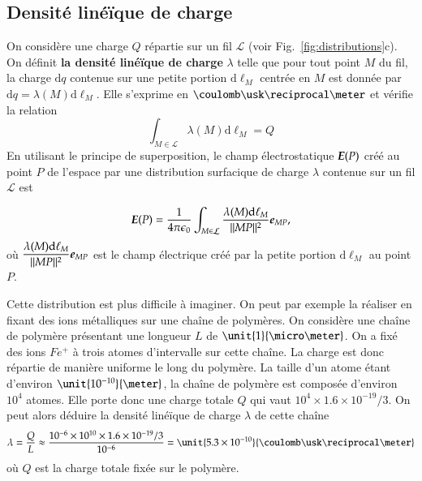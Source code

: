 \subsection{Densité linéïque de charge}
	On considère une charge $Q$ répartie sur un fil $\mathcal{L}$
	(voir Fig.~\ref{fig:distributions}c). 
	On définit \textbf{
	la densité linéïque de charge} $\lambda$ 
	telle que pour tout point $M$ du fil,
	la charge $\mathrm{d}q$ contenue sur une petite portion $\mathrm{d}\ell_M$ centrée 
	en $M$ est donnée par $\mathrm{d}q = \lambda(M) \mathrm{d}\ell_M$.
	Elle s'exprime en $\coulomb \usk \reciprocal \meter$ et vérifie la relation
\begin{equation*}
	\int_{M \in \mathcal{L}} \lambda(M) \mathrm{d}\ell_M = Q
\end{equation*}
En utilisant le principe de superposition, le champ électrostatique $\vece(P)$
créé au point $P$ de l'espace par une distribution surfacique de charge $\lambda$
contenue sur un fil $\mathcal{L}$ est

\begin{equation}
	\vece(P) = \pieps \int_{M \in \mathcal{L}} 
	\dfrac{\lambda(M) \mathrm{d}\ell_M}{||MP||^2}\mitbf{e}_{MP},
\end{equation}
où $\dfrac{\lambda(M) \mathrm{d}\ell_M}{||MP||^2}\mitbf{e}_{MP}$ est le champ 
électrique créé par la petite portion $\mathrm{d}\ell_M$ au point $P$.

\begin{exemple}
	Cette distribution est plus difficile à imaginer.
	On peut par exemple la réaliser en fixant des 
	ions métalliques sur une chaîne de polymères. On considère une chaîne de
	polymère présentant une longueur $L$ de $\unit{1}{\micro \meter}$. On a 
	fixé des ions $Fe^+$ à trois atomes d'intervalle sur cette chaîne.
	La charge est donc répartie de manière uniforme le long du polymère.
	La taille d'un atome étant d'environ $\unit{10^{-10}}{\meter}$, la chaîne de 
	polymère est composée d'environ $10^4$ atomes. Elle porte
	donc une charge totale $Q$ qui vaut $10^4 \times 1.6 \times 10^{-19}/3$.
	On peut alors déduire la
	densité linéïque de charge $\lambda$ de cette chaîne
	\begin{equation}
		\lambda = \dfrac{Q}{L} \approx \dfrac{10^{-6}\times 10^{10}
			           \times 1.6 \times 10^{-19}/3}{10^{-6}}
				= \unit{5.3 \times 10^{-10}}{\coulomb \usk
				   \reciprocal \meter}
	\end{equation}
	où $Q$ est la charge totale fixée sur le polymère.
\end{exemple}


